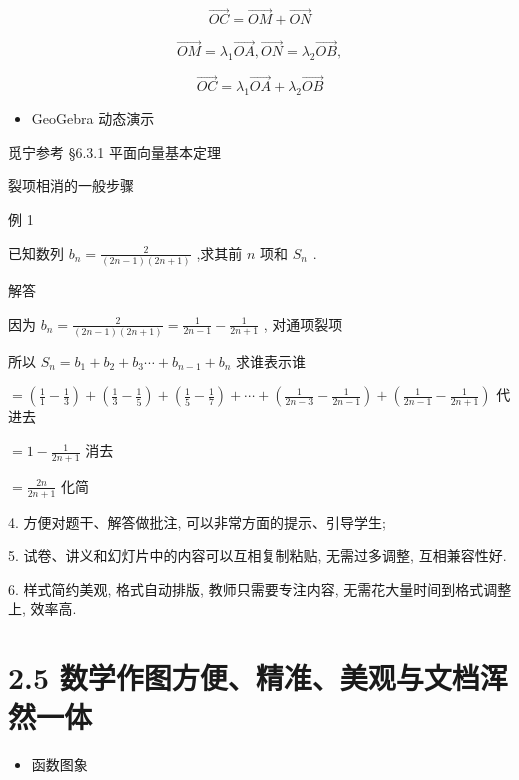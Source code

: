 \documentclass[10pt]{article}
\begin{document}
\[
\overrightarrow{OC} = \overrightarrow{OM} + \overrightarrow{ON}
\]

\[
\overrightarrow{OM} = {\lambda }_{1}\overrightarrow{OA},\overrightarrow{ON} = {\lambda }_{2}\overrightarrow{OB},
\]

\[
\overrightarrow{OC} = {\lambda }_{1}\overrightarrow{OA} + {\lambda }_{2}\overrightarrow{OB}
\]

\begin{itemize}\relax
\item\relax GeoGebra 动态演示
\end{itemize}

觅宁参考 §6.3.1 平面向量基本定理

裂项相消的一般步骤

例 1

已知数列 \({b}_{n} = \frac{2}{\left( {{2n} - 1}\right) \left( {{2n} + 1}\right) }\) ,求其前 \(n\) 项和 \({S}_{n}\) .

解答

因为 \({b}_{n} = \frac{2}{\left( {{2n} - 1}\right) \left( {{2n} + 1}\right) } = \frac{1}{{2n} - 1} - \frac{1}{{2n} + 1}\) , 对通项裂项

所以 \({S}_{n} = {b}_{1} + {b}_{2} + {b}_{3}\cdots  + {b}_{n - 1} + {b}_{n}\) 求谁表示谁

\(= \left( {\frac{1}{1} - \frac{1}{3}}\right)  + \left( {\frac{1}{3} - \frac{1}{5}}\right)  + \left( {\frac{1}{5} - \frac{1}{7}}\right)  + \cdots  + \left( {\frac{1}{{2n} - 3} - \frac{1}{{2n} - 1}}\right)  + \left( {\frac{1}{{2n} - 1} - \frac{1}{{2n} + 1}}\right)\) 代进去

\(= 1 - \frac{1}{{2n} + 1}\) 消去

\(= \frac{2n}{{2n} + 1}\) 化简

4. 方便对题干、解答做批注, 可以非常方面的提示、引导学生;

5. 试卷、讲义和幻灯片中的内容可以互相复制粘贴, 无需过多调整, 互相兼容性好.

6. 样式简约美观, 格式自动排版, 教师只需要专注内容, 无需花大量时间到格式调整上, 效率高.

\section*{2.5 数学作图方便、精准、美观与文档浑然一体}

\begin{itemize}\relax
\item\relax 函数图象
\end{itemize}
\end{document}
